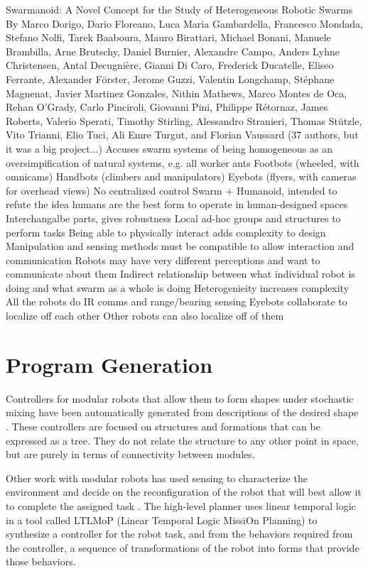 Swarmanoid: A Novel Concept for the Study of Heterogeneous Robotic Swarms
By Marco Dorigo, Dario Floreano, Luca Maria Gambardella, Francesco Mondada, Stefano Nolfi, Tarek Baaboura, Mauro Birattari, Michael Bonani, Manuele Brambilla, Arne Brutschy, Daniel Burnier, Alexandre Campo, Anders Lyhne Christensen, Antal Decugnière, Gianni Di Caro, Frederick Ducatelle, Eliseo Ferrante, Alexander Förster, Jerome Guzzi, Valentin Longchamp, Stéphane Magnenat, Javier Martinez Gonzales, Nithin Mathews,
Marco Montes de Oca, Rehan O’Grady, Carlo Pinciroli, Giovanni Pini, Philippe Rétornaz, James Roberts, Valerio Sperati, Timothy Stirling, Alessandro Stranieri, Thomas Stützle, Vito Trianni, Elio Tuci, Ali Emre Turgut, and Florian Vaussard
(37 authors, but it was a big project...)
	Accuses swarm systems of being homogeneous as an oversimpification of natural systems, e.g. all worker ants
	Footbots (wheeled, with omnicams)
	Handbots (climbers and manipulators)
	Eyebots (flyers, with cameras for overhead views)
	No centralized control
	Swarm + Humanoid, intended to refute the idea humans are the best form to operate in human-designed spaces
	Interchangalbe parts, gives robustness
	Local ad-hoc groups and structures to perform tasks
	Being able to physically interact adds complexity to design
		Manipulation and sensing methods must be compatible to allow interaction and communication
		Robots may have very different perceptions and want to communicate about them
	Indirect relationship between what individual robot is doing and what swarm as a whole is doing
		Heterogenieity increases complexity
	All the robots do IR comms and range/bearing sensing
	Eyebots collaborate to localize off each other
		Other robots can also localize off of them

\section{Program Generation}

Controllers for modular robots that allow them to form shapes under stochastic mixing have been automatically generated from descriptions of the desired shape \citep{klavins2002automatic}. 
These controllers are focused on structures and formations that can be expressed as a tree. 
They do not relate the structure to any other point in space, but are purely in terms of connectivity between modules. 

Other work with modular robots has used sensing to characterize the environment and decide on the reconfiguration of the robot that will best allow it to complete the assigned task \cite{daudelin2017integrated, jing2016end}.
The high-level planner uses linear temporal logic in a tool called LTLMoP (Linear Temporal Logic MissiOn Planning) to synthesize a controller for the robot task, and from the behaviors required from the controller, a sequence of transformations of the robot into forms that provide those behaviors. 
	
